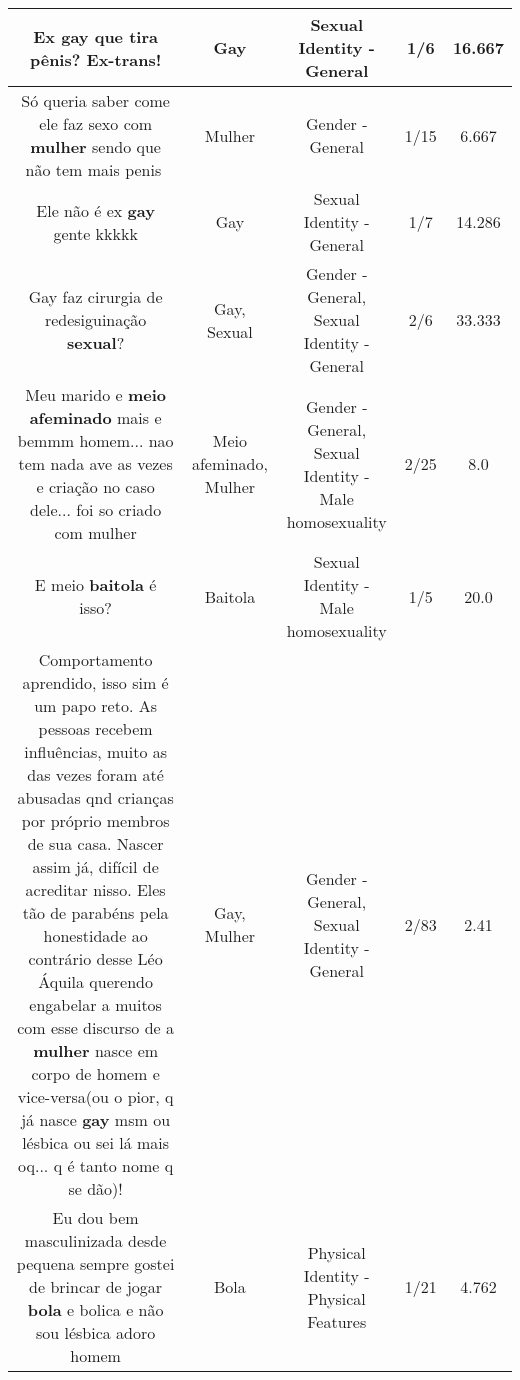 \documentclass[11pt]{article}
\newlength\mylength
\begin{document}
\begin{center}
\begin{longtable}{|C{.65\mylength}|C{.30\mylength}|C{.12\mylength}|C{.12\mylength}|C{.12\mylength}|}
  \small Ex \textbf{gay} que tira pênis? Ex-trans!\normalsize   & Gay & Sexual Identity - General & 1/6 & 16.667 \\  \hline
  \small Só queria saber come ele faz sexo com \textbf{mulher} sendo que não tem mais penis🤔\normalsize   & Mulher & Gender - General & 1/15 & 6.667 \\  \hline
  \small Ele não é ex \textbf{gay} gente kkkkk\normalsize   & Gay & Sexual Identity - General & 1/7 & 14.286 \\  \hline
  \small Gay faz cirurgia de redesiguinação \textbf{sexual}?\normalsize   & Gay, Sexual & Gender - General, Sexual Identity - General & 2/6 & 33.333 \\  \hline
  \small Meu marido e \textbf{meio afeminado} mais e bemmm homem... nao tem nada ave as vezes e criação no caso dele... foi so criado com mulher\normalsize   & Meio afeminado, Mulher & Gender - General, Sexual Identity - Male homosexuality & 2/25 & 8.0 \\  \hline
  \small E meio \textbf{baitola} é isso?\normalsize   & Baitola & Sexual Identity - Male homosexuality & 1/5 & 20.0 \\  \hline
  \small Comportamento aprendido, isso sim é um papo reto. As pessoas recebem influências, muito as das vezes foram até abusadas qnd crianças por próprio membros de sua casa. Nascer assim já, difícil de acreditar nisso. Eles tão de parabéns pela honestidade ao contrário desse Léo Áquila querendo engabelar a muitos com esse discurso de a \textbf{mulher} nasce em corpo de homem e vice-versa(ou o pior, q já nasce \textbf{gay} msm ou lésbica ou sei lá mais oq... q é tanto nome q se dão)!\normalsize   & Gay, Mulher & Gender - General, Sexual Identity - General & 2/83 & 2.41 \\  \hline
  \small Eu dou bem masculinizada desde pequena sempre gostei de brincar de jogar \textbf{bola} e bolica e não sou lésbica adoro homem\normalsize   & Bola & Physical Identity - Physical Features & 1/21 & 4.762 \\  \hline

\end{longtable}
\end{center}
\end{document}
